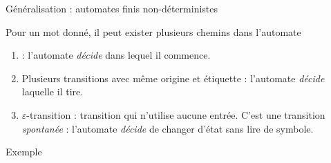 
\begingroup

\begin{frame}{Généralisation : automates finis non-déterministes}

  Pour un mot donné, il peut exister plusieurs chemins dans l'automate
  \begin{enumerate}
  \item {} : l'automate \textit{décide} dans lequel il commence.
  \item \alert{Plusieurs transitions avec même origine et étiquette} : l'automate \textit{décide} laquelle il tire.
  \item {\color{example} $\varepsilon$-transition} : transition qui n'utilise aucune entrée.
    C'est une transition \textit{spontanée} : l'automate \textit{décide} de changer d'état sans lire de symbole.
  \end{enumerate}
  
  \begin{exampleblock}{Exemple}%
    \centering  
  \end{exampleblock}

\end{frame}

\endgroup
